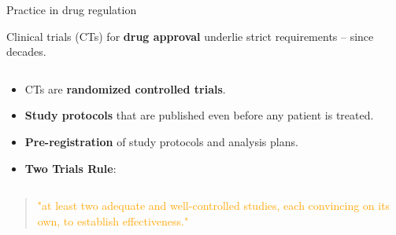 \documentclass[
  10pt,
  ignorenonframetext,
]{beamer}
\providecommand{\tightlist}{%
  \setlength{\itemsep}{0pt}\setlength{\parskip}{0pt}}
\begin{document}
\begin{frame}
\begin{block}{Practice in drug regulation}
\protect\hypertarget{practice-in-drug-regulation}{}
\vspace{4mm}

Clinical trials (CTs) for \textbf{drug approval} underlie strict
requirements -- since decades.

\(~\)

\begin{itemize}
\tightlist
\item
  CTs are \textbf{randomized controlled trials}.
\end{itemize}

\vspace{2mm}

\begin{itemize}
\tightlist
\item
  \textbf{Study protocols} that are published even before any patient is
  treated.
\end{itemize}

\vspace{2mm}

\begin{itemize}
\tightlist
\item
  \textbf{Pre-registration} of study protocols and analysis plans.
\end{itemize}

\vspace{2mm}

\begin{itemize}
\tightlist
\item
  \textbf{Two Trials Rule}:
\end{itemize}

\(~\)

\begin{quote}
\textcolor{orange}{"at least two adequate and well-controlled studies,
each convincing on its own, to establish effectiveness."}
\end{quote}

\(~\)

\(~\)
\end{block}
\end{frame}
\end{document}
